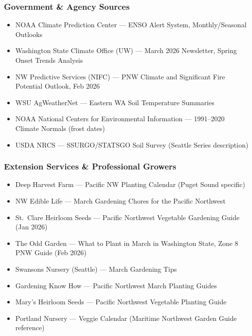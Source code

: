\documentclass[11pt,letterpaper]{article}
\begin{document}
\subsubsection{Government \& Agency Sources}
\begin{itemize}[leftmargin=*]
\item NOAA Climate Prediction Center --- ENSO Alert System, Monthly/Seasonal Outlooks
\item Washington State Climate Office (UW) --- March 2026 Newsletter, Spring Onset Trends Analysis
\item NW Predictive Services (NIFC) --- PNW Climate and Significant Fire Potential Outlook, Feb 2026
\item WSU AgWeatherNet --- Eastern WA Soil Temperature Summaries
\item NOAA National Centers for Environmental Information --- 1991--2020 Climate Normals (frost dates)
\item USDA NRCS --- SSURGO/STATSGO Soil Survey (Seattle Series description)
\end{itemize}

\subsubsection{Extension Services \& Professional Growers}
\begin{itemize}[leftmargin=*]
\item Deep Harvest Farm --- Pacific NW Planting Calendar (Puget Sound specific)
\item NW Edible Life --- March Gardening Chores for the Pacific Northwest
\item St.\ Clare Heirloom Seeds --- Pacific Northwest Vegetable Gardening Guide (Jan 2026)
\item The Odd Garden --- What to Plant in March in Washington State, Zone 8 PNW Guide (Feb 2026)
\item Swansons Nursery (Seattle) --- March Gardening Tips
\item Gardening Know How --- Pacific Northwest March Planting Guides
\item Mary's Heirloom Seeds --- Pacific Northwest Vegetable Planting Guide
\item Portland Nursery --- Veggie Calendar (Maritime Northwest Garden Guide reference)
\end{itemize}
\end{document}
